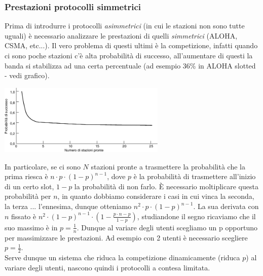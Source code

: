 \documentclass[10pt,a4paper,twoside]{article}
\begin{document}
\subsubsection{Prestazioni protocolli simmetrici}
Prima di introdurre i protocolli \textit{asimmetrici} (in cui le stazioni non sono tutte uguali) è necessario analizzare le prestazioni di quelli \textit{simmetrici} (ALOHA, CSMA, etc...). Il vero problema di questi ultimi è la competizione, infatti quando ci sono poche stazioni c'è alta probabilità di successo, all'aumentare di questi la banda si stabilizza ad una certa percentuale (ad esempio 36\% in ALOHA slotted - vedi grafico).
\begin{center}
\includegraphics[width=0.6\textwidth]{images/canali_simmetrici.png}
\end{center}
In particolare, se ci sono $N$ stazioni pronte a trasmettere la probabilità che la prima riesca è $n \cdot p \cdot (1-p)^{n-1}$, dove $p$ è la probabilità di trasmettere all'inizio di un certo slot, $1-p$ la probabilità di non farlo. È necessario moltiplicare questa probabilità per $n$, in quanto dobbiamo considerare i casi in cui vinca la seconda, la terza ... l'ennesima, dunque otteniamo $n^2 \cdot p \cdot (1-p)^{n-1}$. La sua derivata con $n$ fissato è $n^2 \cdot (1-p)^{n-1} \cdot (1-\frac{p \cdot n-p}{1-p})$, studiandone il segno ricaviamo che il suo massimo è in $p=\frac{1}{n}$. Dunque al variare degli utenti scegliamo un p opportuno per massimizzare le prestazioni. Ad esempio con 2 utenti è necessario scegliere $p=\frac{1}{2}$.\\
Serve dunque un sistema che riduca la competizione dinamicamente (riduca $p$) al variare degli utenti, nascono quindi i protocolli a contesa limitata.
\end{document}
